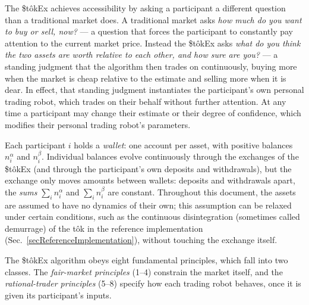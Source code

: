 \documentclass[letterpaper]{article}
\newcommand{\StokEx}{\$t\^{o}kEx}
\newcommand{\tok}{t\^{o}k}
\begin{document}
The \StokEx{} achieves accessibility by asking a participant a different question than a traditional market does. A traditional market asks \emph{how much do you want to buy or sell, now?} --- a question that forces the participant to constantly pay attention to the current market price. Instead the \StokEx{} asks \emph{what do you think the two assets are worth relative to each other, and how sure are you?} --- a standing judgment that the algorithm then trades on continuously, buying more when the market is cheap relative to the estimate and selling more when it is dear. In effect, that standing judgment instantiates the participant's own personal trading robot, which trades on their behalf without further attention. At any time a participant may change their estimate or their degree of confidence, which modifies their personal trading robot's parameters.

Each participant $i$ holds a \emph{wallet}: one account per asset, with positive balances $n^\alpha_i$ and $n^\beta_i$. Individual balances evolve continuously through the exchanges of the \StokEx{} (and through the participant's own deposits and withdrawals), but the exchange only moves amounts between wallets: deposits and withdrawals apart, the \emph{sums} $\sum_i n^\alpha_i$ and $\sum_i n^\beta_i$ are constant. Throughout this document, the assets are assumed to have no dynamics of their own; this assumption can be relaxed under certain conditions, such as the continuous disintegration (sometimes called demurrage) of the \tok{} in the reference implementation (Sec.~\ref{secReferenceImplementation}), without touching the exchange itself.

The \StokEx{} algorithm obeys eight fundamental principles, which fall into two classes. The \emph{fair-market principles} (1--4) constrain the market itself, and the \emph{rational-trader principles} (5--8) specify how each trading robot behaves, once it is given its participant's inputs.
\end{document}
